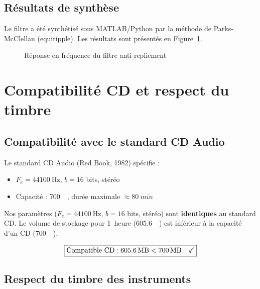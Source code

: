 \documentclass[12pt, a4paper, french]{article}
\newcommand{\Fe}{F_e}
\begin{document}
\subsection{Résultats de synthèse}

Le filtre a été synthétisé sous MATLAB/Python par la méthode de Parks-McClellan (equiripple). Les résultats sont présentés en Figure~\ref{fig:filtre}.

\begin{figure}[H]
    \centering
    \caption{Réponse en fréquence du filtre anti-repliement}
    \label{fig:filtre}
\end{figure}

\section{Compatibilité CD et respect du timbre}
\label{sec:compatibilite}

\subsection{Compatibilité avec le standard CD Audio}

Le standard CD Audio (Red Book, 1982) spécifie :
\begin{itemize}
    \item $\Fe = \SI{44100}{\hertz}$, $b = 16$ bits, stéréo
    \item Capacité : \SI{700}{\mega\byte}, durée maximale $\approx \SI{80}{min}$
\end{itemize}

Nos paramètres ($\Fe = \SI{44100}{\hertz}$, $b = 16$ bits, stéréo) sont \textbf{identiques} au standard CD. Le volume de stockage pour 1~heure (\SI{605.6}{\mega\byte}) est inférieur à la capacité d'un CD (\SI{700}{\mega\byte}).

\begin{equation}
    \boxed{\text{Compatible CD} : \SI{605.6}{\mega\byte} < \SI{700}{\mega\byte} \quad \checkmark}
\end{equation}

\subsection{Respect du timbre des instruments}
\end{document}

